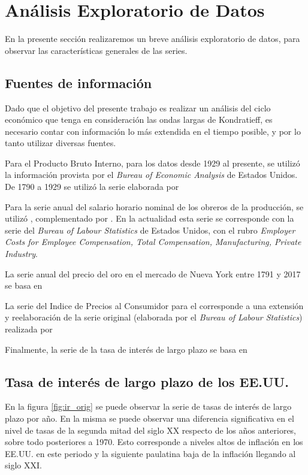 \documentclass[a4paper]{article}
\begin{document}
\section{Análisis Exploratorio de Datos}
En la presente sección realizaremos un breve análisis exploratorio de datos, para observar las características generales de las series.

\subsection{Fuentes de información}

Dado que el objetivo del presente trabajo es realizar un análisis del ciclo económico que tenga en consideración las ondas largas de Kondratieff, es necesario contar con información lo más extendida en el tiempo posible, y por lo tanto utilizar diversas fuentes. 

Para el Producto Bruto Interno, para los datos desde 1929 al presente, se utilizó la información provista por el \textit{Bureau of Economic Analysis} de Estados Unidos. De 1790 a 1929 se utilizó la serie elaborada por \cite{johnston2018us}

Para la serie anual del salario horario nominal de los obreros de la producción, se utilizó \citep{officer2009two}, complementado por \citep{Roesch2018}. En la actualidad esta serie se corresponde con la serie del \textit{Bureau of Labour Statistics} de Estados Unidos, con el rubro \textit{Employer Costs for Employee Compensation, Total Compensation, Manufacturing, Private Industry}.

La serie anual del precio del oro en el mercado de Nueva York entre 1791 y 2017 se basa en \cite{officer2018gold}

La serie del Indice de Precios al Consumidor para el corresponde a una extensión y reelaboración de la serie original (elaborada por el \textit{Bureau of Labour Statistics}) realizada por \cite{officer2018cpi}

Finalmente, la serie de la tasa de interés de largo plazo se basa en \cite{officer2018ir}

\subsection{Tasa de interés de largo plazo de los EE.UU.}
En la figura \ref{fig:ir_orig} se puede observar la serie de tasas de interés de largo plazo por año. En la misma se puede observar una diferencia significativa en el nivel de tasas de la segunda mitad del siglo XX respecto de los años anteriores, sobre todo posteriores a 1970. Esto corresponde a niveles altos de inflación en los EE.UU. en este periodo y la siguiente paulatina baja de la inflación llegando al siglo XXI.
\end{document}
